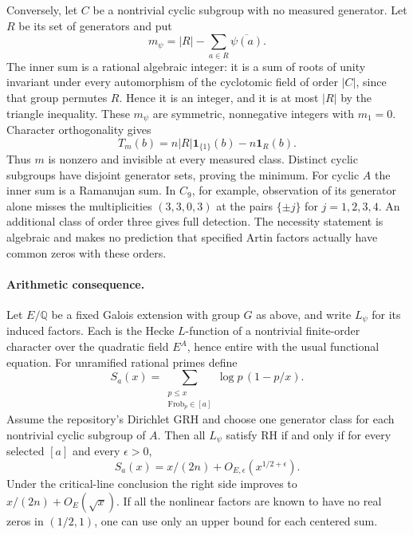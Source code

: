 Conversely, let $C$ be a nontrivial cyclic subgroup with no measured generator. Let $R$ be its set of generators and put
\[
            m_\psi=|R|-\sum_{a\in R}\overline{\psi(a)}.
\]
The inner sum is a rational algebraic integer: it is a sum of roots of unity invariant under every automorphism of the cyclotomic field of order $|C|$, since that group permutes $R$. Hence it is an integer, and it is at most $|R|$ by the triangle inequality. These $m_\psi$ are symmetric, nonnegative integers with $m_1=0$. Character orthogonality gives
\[
             T_m(b)=n|R|\mathbf 1_{\{1\}}(b)-n\mathbf 1_R(b).
\]
Thus $m$ is nonzero and invisible at every measured class. Distinct cyclic subgroups have disjoint generator sets, proving the minimum. For cyclic $A$ the inner sum is a Ramanujan sum. In $C_9$, for example, observation of its generator alone misses the multiplicities $(3,3,0,3)$ at the pairs $\{\pm j\}$ for $j=1,2,3,4$. An additional class of order three gives full detection. The necessity statement is algebraic and makes no prediction that specified Artin factors actually have common zeros with these orders.

\paragraph{Arithmetic consequence.}
Let $E/\mathbb Q$ be a fixed Galois extension with group $G$ as above, and write $L_\psi$ for its induced factors. Each is the Hecke $L$-function of a nontrivial finite-order character over the quadratic field $E^A$, hence entire with the usual functional equation. For unramified rational primes define
\[
 S_a(x)=\sum_{\substack{p\le x\\ \mathrm{Frob}_p\in[a]}}\log p\,(1-p/x).
\]
Assume the repository's Dirichlet GRH and choose one generator class for each nontrivial cyclic subgroup of $A$. Then all $L_\psi$ satisfy RH if and only if for every selected $[a]$ and every $\epsilon>0$,
\[
             S_a(x)=x/(2n)+O_{E,\epsilon}(x^{1/2+\epsilon}).
\]
Under the critical-line conclusion the right side improves to $x/(2n)+O_E(\sqrt x)$. If all the nonlinear factors are known to have no real zeros in $(1/2,1)$, one can use only an upper bound for each centered sum.

